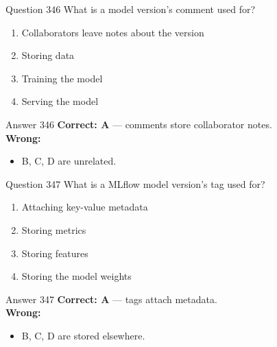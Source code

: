\documentclass[aspectratio=169,11pt]{beamer}
\begin{document}
	\begin{frame}{Question 346}
		What is a model version's comment used for?
		\begin{enumerate}[label=\Alph*.]
			\item Collaborators leave notes about the version
			\item Storing data
			\item Training the model
			\item Serving the model
		\end{enumerate}
	\end{frame}
	\begin{frame}{Answer 346}
		\textbf{Correct: A} --- comments store collaborator notes.\\
		\vspace{0.5em}
		\textbf{Wrong:}
		\begin{itemize}
			\item B, C, D are unrelated.
		\end{itemize}
	\end{frame}
	
	\begin{frame}{Question 347}
		What is a MLflow model version's tag used for?
		\begin{enumerate}[label=\Alph*.]
			\item Attaching key-value metadata
			\item Storing metrics
			\item Storing features
			\item Storing the model weights
		\end{enumerate}
	\end{frame}
	\begin{frame}{Answer 347}
		\textbf{Correct: A} --- tags attach metadata.\\
		\vspace{0.5em}
		\textbf{Wrong:}
		\begin{itemize}
			\item B, C, D are stored elsewhere.
		\end{itemize}
	\end{frame}
	
\end{document}
